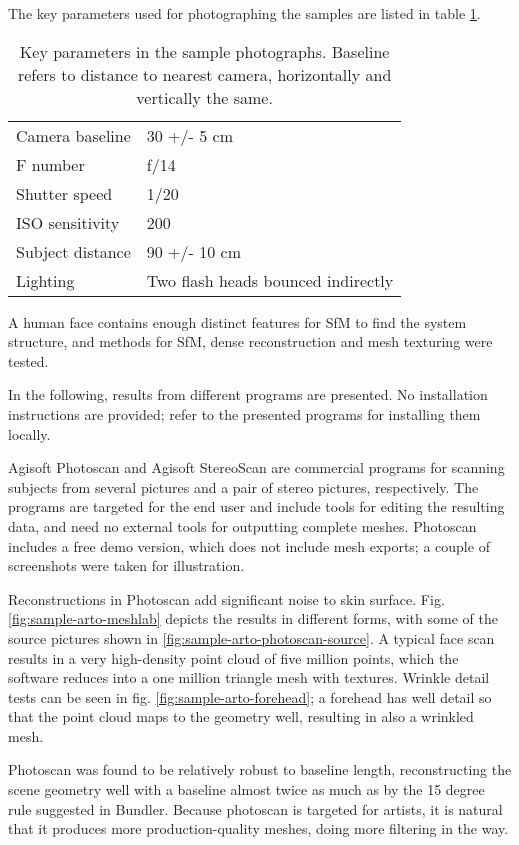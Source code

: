 The key parameters used for photographing the samples are listed in table \ref{tab:sampleshotparams}.

\begin{table}[h]
	\centering
	\begin{tabular}{l l}
		Camera baseline & 30 +/- 5 cm\\
		F number & f/14\\
		Shutter speed & 1/20\\
		ISO sensitivity & 200\\
		Subject distance & 90 +/- 10 cm\\
		Lighting & Two flash heads bounced indirectly\\
	\end{tabular}
	\caption{
		Key parameters in the sample photographs.
		Baseline refers to distance to nearest camera, horizontally and vertically the same.
	}
	\label{tab:sampleshotparams}
\end{table}


A human face contains enough distinct features for SfM to find the system structure, and methods for SfM, dense reconstruction and mesh texturing were tested.

In the following, results from different programs are presented.
No installation instructions are provided; refer to the presented programs for installing them locally.

Agisoft Photoscan and Agisoft StereoScan are commercial programs for scanning subjects from several pictures and a pair of stereo pictures, respectively. \cite{agisoft}
The programs are targeted for the end user and include tools for editing the resulting data, and need no external tools for outputting complete meshes.
Photoscan includes a free demo version, which does not include mesh exports; a couple of screenshots were taken for illustration.

Reconstructions in Photoscan add significant noise to skin surface.
Fig. \ref{fig:sample-arto-meshlab} depicts the results in different forms, with some of the source pictures shown in \ref{fig:sample-arto-photoscan-source}.
A typical face scan results in a very high-density point cloud of five million points, which the software reduces into a one million triangle mesh with textures.
Wrinkle detail tests can be seen in fig. \ref{fig:sample-arto-forehead}; a forehead has well detail so that the point cloud maps to the geometry well, resulting in also a wrinkled mesh.

Photoscan was found to be relatively robust to baseline length, reconstructing the scene geometry well with a baseline almost twice as much as by the 15 degree rule suggested in Bundler.
Because photoscan is targeted for artists, it is natural that it produces more production-quality meshes, doing more filtering in the way.

